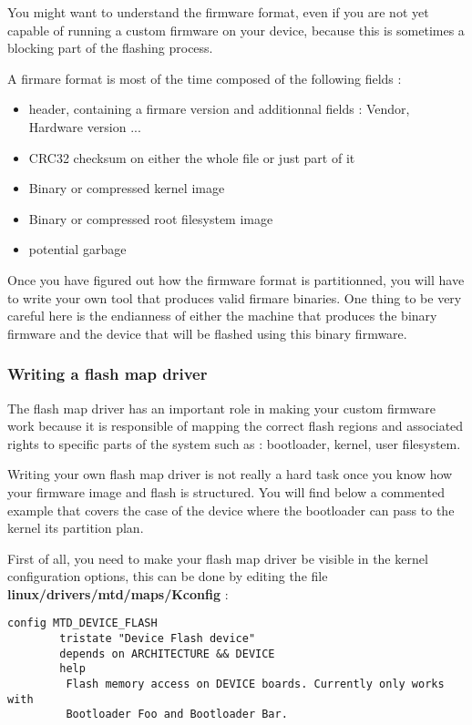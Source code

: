 You might want to understand the firmware format, even if you are not yet capable of running a custom firmware on your device, because this is sometimes a blocking part of the flashing process.

A firmare format is most of the time composed of the following fields :

\begin{itemize}
\item header, containing a firmare version and additionnal fields : Vendor, Hardware version ...
\item CRC32 checksum on either the whole file or just part of it
\item Binary or compressed kernel image
\item Binary or compressed root filesystem image
\item potential garbage
\end{itemize}

Once you have figured out how the firmware format is partitionned, you will have to write your own tool that produces valid firmare binaries. One thing to be very careful here is the endianness of either the machine that produces the binary firmware and the device that will be flashed using this binary firmware.

\subsubsection{Writing a flash map driver}

The flash map driver has an important role in making your custom firmware work because it is responsible of mapping the correct flash regions and associated rights to specific parts of the system such as : bootloader, kernel, user filesystem.

Writing your own flash map driver is not really a hard task once you know how your firmware image and flash is structured. You will find below a commented example that covers the case of the device where the bootloader can pass to the kernel its partition plan.

First of all, you need to make your flash map driver be visible in the kernel configuration options, this can be done by editing the file \textbf{linux/drivers/mtd/maps/Kconfig} :

\begin{verbatim}
config MTD_DEVICE_FLASH
        tristate "Device Flash device"
        depends on ARCHITECTURE && DEVICE
        help
         Flash memory access on DEVICE boards. Currently only works with
         Bootloader Foo and Bootloader Bar.
\end{verbatim}

